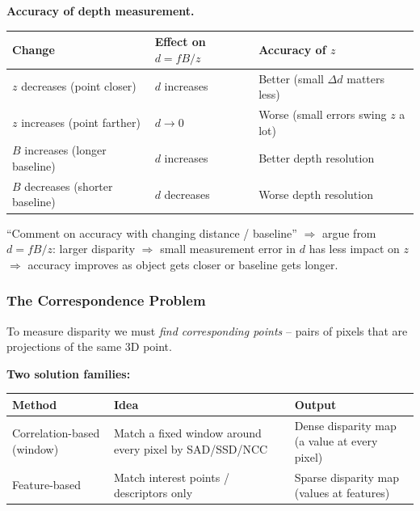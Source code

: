 \separator

\textbf{Accuracy of depth measurement.}

\begin{center}
\renewcommand{\arraystretch}{1.3}
\begin{tabular}{@{} l l l @{}}
\toprule
\textbf{Change} & \textbf{Effect on $d = fB/z$} & \textbf{Accuracy of $z$} \\
\midrule
$z$ decreases (point closer) & $d$ increases & Better (small $\Delta d$ matters less) \\
$z$ increases (point farther) & $d \to 0$ & Worse (small errors swing $z$ a lot) \\
$B$ increases (longer baseline) & $d$ increases & Better depth resolution \\
$B$ decreases (shorter baseline) & $d$ decreases & Worse depth resolution \\
\bottomrule
\end{tabular}
\end{center}

\begin{tipbox}
``Comment on accuracy with changing distance / baseline'' $\Rightarrow$ argue from $d = fB/z$: larger disparity $\Rightarrow$ small measurement error in $d$ has less impact on $z$ $\Rightarrow$ accuracy improves as object gets closer or baseline gets longer.
\end{tipbox}

\bigseparator

\subsubsection{The Correspondence Problem}

To measure disparity we must \emph{find corresponding points} -- pairs of pixels that are projections of the same 3D point.

\textbf{Two solution families:}
\begin{center}
\renewcommand{\arraystretch}{1.3}
\begin{tabular}{@{} l p{4.5cm} p{5.5cm} @{}}
\toprule
\textbf{Method} & \textbf{Idea} & \textbf{Output} \\
\midrule
Correlation-based (window) & Match a fixed window around every pixel by SAD/SSD/NCC & Dense disparity map (a value at every pixel) \\
Feature-based & Match interest points / descriptors only & Sparse disparity map (values at features) \\
\bottomrule
\end{tabular}
\end{center}

